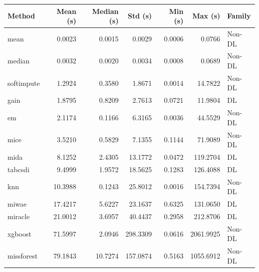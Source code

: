 \begin{tabular}{lrrrrrl}
\toprule
Method & Mean (s) & Median (s) & Std (s) & Min (s) & Max (s) & Family \\
\midrule
mean & 0.0023 & 0.0015 & 0.0029 & 0.0006 & 0.0766 & Non-DL \\
median & 0.0032 & 0.0020 & 0.0034 & 0.0008 & 0.0689 & Non-DL \\
softimpute & 1.2924 & 0.3580 & 1.8671 & 0.0014 & 14.7822 & Non-DL \\
gain & 1.8795 & 0.8209 & 2.7613 & 0.0721 & 11.9804 & DL \\
em & 2.1174 & 0.1166 & 6.3165 & 0.0036 & 44.5529 & Non-DL \\
mice & 3.5210 & 0.5829 & 7.1355 & 0.1144 & 71.9089 & Non-DL \\
mida & 8.1252 & 2.4305 & 13.1772 & 0.0472 & 119.2704 & DL \\
tabcsdi & 9.4999 & 1.9572 & 18.5625 & 0.1283 & 126.4088 & DL \\
knn & 10.3988 & 0.1243 & 25.8012 & 0.0016 & 154.7394 & Non-DL \\
miwae & 17.4217 & 5.6227 & 23.1637 & 0.6325 & 131.0650 & DL \\
miracle & 21.0012 & 3.6957 & 40.4437 & 0.2958 & 212.8706 & DL \\
xgboost & 71.5997 & 2.0946 & 298.3309 & 0.0616 & 2061.9925 & Non-DL \\
missforest & 79.1843 & 10.7274 & 157.0874 & 0.5163 & 1055.6912 & Non-DL \\
\bottomrule
\end{tabular}
